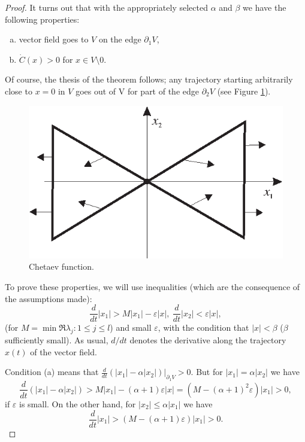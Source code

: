 \begin{theorem}
\begin{proof}
		It turns out that with the appropriately selected $\alpha$ and $\beta$ we have the following properties:
		\begin{enumerate}[(a)]
			\item vector field goes to $V$ on the edge $\partial_1 V$,
			\item $\dot{C}(x) >0$ for $x\in V\setminus 0$.
		\end{enumerate}
	Of course, the thesis of the theorem follows; any trajectory starting arbitrarily close to $x = 0$ in $V$ goes out of V for part of the edge $\partial_2 V$ (see Figure \ref{fig:1.4}).
	\begin{figure}[!ht]
		\centering
		\includegraphics [scale=1.4]{jtr14}
		\caption{Chetaev function.}
		\label{fig:1.4}
	\end{figure}
	
	To prove these properties, we will use inequalities (which are the consequence of the assumptions made):
	$$\frac{d}{dt} \left|x_1\right| > M\left|x_1\right| - \varepsilon\left|x\right|,\ \frac{d}{dt}\left|x_2\right| < \varepsilon\left|x\right|,$$
	(for $M = \min {\Re \lambda_j: 1 \leq j \leq l}$) and small $\varepsilon$, with the condition that $\left|x\right| < \beta$ ($\beta$ sufficiently small). As usual, $d / dt$ denotes the derivative along the trajectory $x (t)$ of the vector field.
	
	Condition (a) means that $\frac{d}{dt} (\left|x_1\right| - \alpha \left|x_2\right|) |_{\partial_1 V}> 0$. But for $\left|x_1\right| = \alpha \left|x_2\right|$ we have
	$$\frac{d}{dt}(\left|x_1\right| - \alpha \left|x_2\right|) > M\left|x_1\right| - (\alpha+1)\varepsilon \left|x\right| = \left(M - (\alpha+1)^2 \varepsilon \right)\left|x_1\right| >0,$$
	if $\varepsilon$ is small. On the other hand, for $\left|x_2\right|\leq \alpha \left|x_1\right|$ we have
	$$\frac{d}{dt}\left|x_1\right| > (M - (\alpha+1)\varepsilon)\left|x_1\right|>0.$$
	\end{proof}
\end{theorem}


